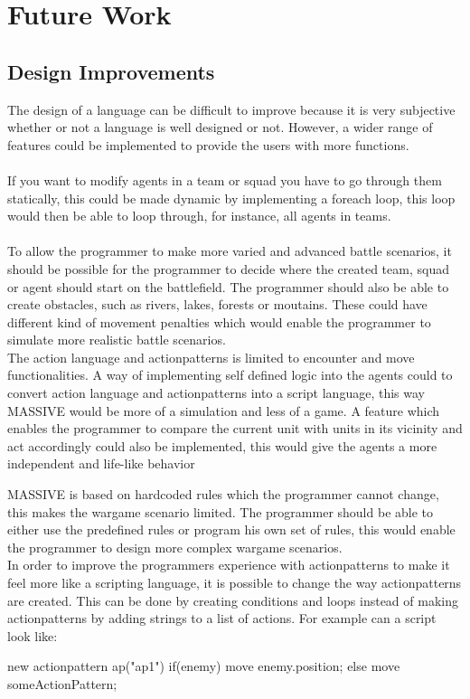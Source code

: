 \chapter{Future Work}
\section{Design Improvements}
The design of a language can be difficult to improve because it is very subjective whether or not a language is well designed or not. However, a wider range of features could be implemented to provide the users with more functions.\\\\
If you want to modify agents in a team or squad you have to go through them statically, this could be made dynamic by implementing a foreach loop, this loop would then be able to loop through, for instance, all agents in teams.\\
\\
To allow the programmer to make more varied and advanced battle scenarios, it should be possible for the programmer to decide where the created team, squad or agent should start on the battlefield. The programmer should also be able to create obstacles, such as rivers, lakes, forests or moutains. These could have different kind of movement penalties which would enable the programmer to simulate more realistic battle scenarios.\\

The action language and actionpatterns is limited to encounter and move functionalities. A way of implementing self defined logic into the agents could to convert action language and actionpatterns into a script language, this way MASSIVE would be more of a simulation and less of a game. A feature which enables the programmer to compare the current unit with units in its vicinity and act accordingly could also be implemented, this would give the agents a more independent and life-like behavior

MASSIVE is based on hardcoded rules which the programmer cannot change, this makes the wargame scenario limited. The programmer should be able to either use the predefined rules or program his own set of rules, this would enable the programmer to design more complex wargame scenarios. \\

In order to improve the programmers experience with actionpatterns to make it feel more like a scripting language, it is possible to change the way actionpatterns are created. This can be done by creating conditions and loops instead of making actionpatterns by adding strings to a list of actions. For example can a script look like:
\begin{source}{}{}
new actionpattern ap("ap1")
{
	if(enemy)
	{
		move enemy.position;
	}
	else
	{
		move someActionPattern;
	}
}
\end{source}

